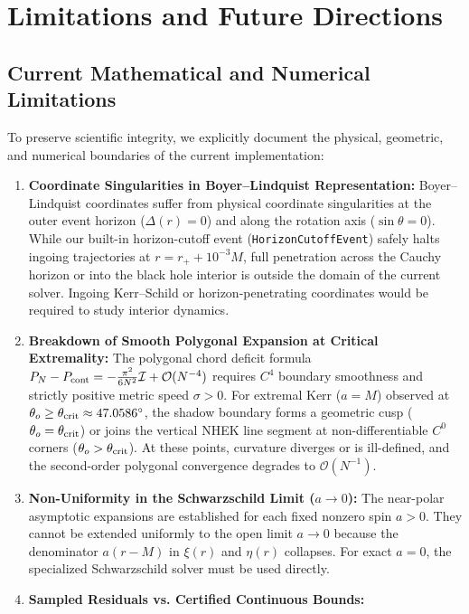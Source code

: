 \section{Limitations and Future Directions}
\label{sec:limitations_future_work}

\subsection{Current Mathematical and Numerical Limitations}
To preserve scientific integrity, we explicitly document the physical, geometric, and numerical boundaries of the current implementation:
\begin{enumerate}
    \item \textbf{Coordinate Singularities in Boyer--Lindquist Representation:}  
    Boyer--Lindquist coordinates suffer from physical coordinate singularities at the outer event horizon ($\Delta(r) = 0$) and along the rotation axis ($\sin\theta = 0$). While our built-in horizon-cutoff event (\texttt{HorizonCutoffEvent}) safely halts ingoing trajectories at $r = r_+ + 10^{-3}M$, full penetration across the Cauchy horizon or into the black hole interior is outside the domain of the current solver. Ingoing Kerr--Schild or horizon-penetrating coordinates would be required to study interior dynamics.
    \item \textbf{Breakdown of Smooth Polygonal Expansion at Critical Extremality:}  
    The polygonal chord deficit formula $P_N - P_{\rm cont} = -\frac{\pi^2}{6N^2}\mathcal{I} + \mathcal{O}(N^{-4})$ requires $C^4$ boundary smoothness and strictly positive metric speed $\sigma > 0$. For extremal Kerr ($a = M$) observed at $\theta_o \ge \theta_{\rm crit} \approx 47.0586^\circ$, the shadow boundary forms a geometric cusp ($\theta_o = \theta_{\rm crit}$) or joins the vertical NHEK line segment at non-differentiable $C^0$ corners ($\theta_o > \theta_{\rm crit}$). At these points, curvature diverges or is ill-defined, and the second-order polygonal convergence degrades to $\mathcal{O}(N^{-1})$.
    \item \textbf{Non-Uniformity in the Schwarzschild Limit ($a \to 0$):}  
    The near-polar asymptotic expansions are established for each fixed nonzero spin $a > 0$. They cannot be extended uniformly to the open limit $a \to 0$ because the denominator $a(r - M)$ in $\xi(r)$ and $\eta(r)$ collapses. For exact $a = 0$, the specialized Schwarzschild solver must be used directly.
    \item \textbf{Sampled Residuals vs. Certified Continuous Bounds:}  

\end{enumerate}
